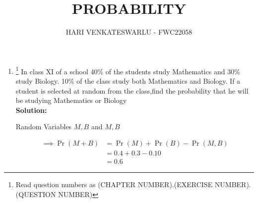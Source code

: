 \documentclass{article}
\providecommand{\pr}[1]{\ensuremath{\Pr\left(#1\right)}}
\newcommand{\solution}{\noindent \textbf{Solution: }}
\providecommand{\pr}[1]{\ensuremath{\Pr\left(#1\right)}}
\begin{document}
\title{PROBABILITY}
\author{\Large HARI VENKATESWARLU - FWC22058}
\date{}

\maketitle

\begin{enumerate}[label=16.\arabic{enumi}.\arabic{enumii}]%
\setcounter{enumi}{2}
\setcounter{enumii}{18}

\item \footnote{Read question numbers as (CHAPTER NUMBER).(EXERCISE NUMBER).(QUESTION NUMBER)} {In class XI of a school 40\% of the students study Mathematics and 30\% study Biology. 10\% of the class study both Mathematics and Biology. If a student is selected at random from the class,find the probability that he will be studying Mathematics or Biology}\\[1ex]
	\solution\\
	
\begin{table}[h]\centering
	
   	\caption{Random Variables $M,B$ and $M,B$}
\label{table1:}
\end{table}
	\begin{align}
	  \implies \pr{M+B} &= \pr{M}+\pr{B}-\pr{M,B}\\
	  &=0.4+0.3-0.10\\
	  &=0.6
\end{align}
\end{enumerate}
\end{document}
